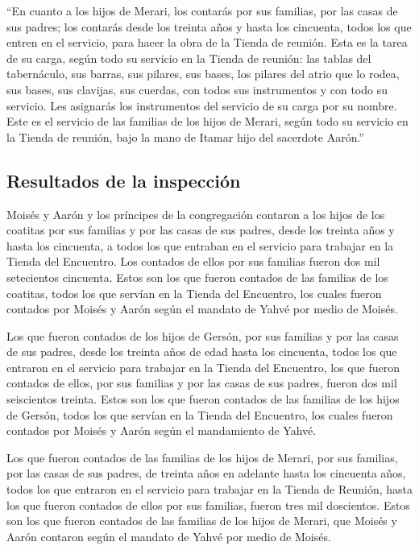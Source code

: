 \begin{paracol}{2}
 ``En cuanto a los hijos de Merari, los contarás por sus
familias, por las casas de sus padres;  los contarás
desde los treinta años y hasta los cincuenta, todos los que entren en el
servicio, para hacer la obra de la Tienda de reunión. 
Esta es la tarea de su carga, según todo su servicio en la Tienda de
reunión: las tablas del tabernáculo, sus barras, sus pilares, sus bases,
 los pilares del atrio que lo rodea, sus bases, sus
clavijas, sus cuerdas, con todos sus instrumentos y con todo su
servicio. Les asignarás los instrumentos del servicio de su carga por su
nombre.  Este es el servicio de las familias de los hijos
de Merari, según todo su servicio en la Tienda de reunión, bajo la mano
de Itamar hijo del sacerdote Aarón.''

\hypertarget{resultados-de-la-inspecciuxf3n}{%
\subsection{Resultados de la
inspección}\label{resultados-de-la-inspecciuxf3n}}

 Moisés y Aarón y los príncipes de la congregación
contaron a los hijos de los coatitas por sus familias y por las casas de
sus padres,  desde los treinta años y hasta los
cincuenta, a todos los que entraban en el servicio para trabajar en la
Tienda del Encuentro.  Los contados de ellos por sus
familias fueron dos mil setecientos cincuenta.  Estos son
los que fueron contados de las familias de los coatitas, todos los que
servían en la Tienda del Encuentro, los cuales fueron contados por
Moisés y Aarón según el mandato de Yahvé por medio de Moisés.

 Los que fueron contados de los hijos de Gersón, por sus
familias y por las casas de sus padres,  desde los
treinta años de edad hasta los cincuenta, todos los que entraron en el
servicio para trabajar en la Tienda del Encuentro,  los
que fueron contados de ellos, por sus familias y por las casas de sus
padres, fueron dos mil seiscientos treinta.  Estos son
los que fueron contados de las familias de los hijos de Gersón, todos
los que servían en la Tienda del Encuentro, los cuales fueron contados
por Moisés y Aarón según el mandamiento de Yahvé.

 Los que fueron contados de las familias de los hijos de
Merari, por sus familias, por las casas de sus padres, 
de treinta años en adelante hasta los cincuenta años, todos los que
entraron en el servicio para trabajar en la Tienda de Reunión,
 hasta los que fueron contados de ellos por sus familias,
fueron tres mil doscientos.  Estos son los que fueron
contados de las familias de los hijos de Merari, que Moisés y Aarón
contaron según el mandato de Yahvé por medio de Moisés.


\end{paracol}

